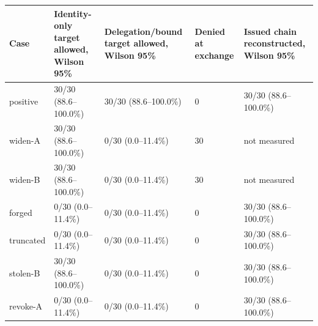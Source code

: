 \begin{tabular}{lllll}
\hline
Case & Identity-only target allowed, Wilson 95\% & Delegation/bound target allowed, Wilson 95\% & Denied at exchange & Issued chain reconstructed, Wilson 95\% \\
\hline
positive & 30/30 (88.6--100.0\%) & 30/30 (88.6--100.0\%) & 0 & 30/30 (88.6--100.0\%) \\
widen-A & 30/30 (88.6--100.0\%) & 0/30 (0.0--11.4\%) & 30 & not measured \\
widen-B & 30/30 (88.6--100.0\%) & 0/30 (0.0--11.4\%) & 30 & not measured \\
forged & 0/30 (0.0--11.4\%) & 0/30 (0.0--11.4\%) & 0 & 30/30 (88.6--100.0\%) \\
truncated & 0/30 (0.0--11.4\%) & 0/30 (0.0--11.4\%) & 0 & 30/30 (88.6--100.0\%) \\
stolen-B & 30/30 (88.6--100.0\%) & 0/30 (0.0--11.4\%) & 0 & 30/30 (88.6--100.0\%) \\
revoke-A & 0/30 (0.0--11.4\%) & 0/30 (0.0--11.4\%) & 0 & 30/30 (88.6--100.0\%) \\
\hline
\end{tabular}
